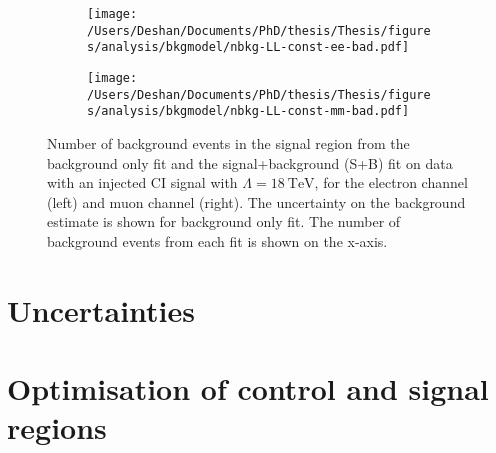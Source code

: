 \begin{figure}[h!]
    \centering
    \begin{subfigure}[b]{0.49\textwidth}
        \centering
        \texttt{[image: /Users/Deshan/Documents/PhD/thesis/Thesis/figures/analysis/bkgmodel/nbkg-LL-const-ee-bad.pdf]}
        \label{fig:bkgmodel:fitsbplusb1bad}
    \end{subfigure}
    \begin{subfigure}[b]{0.49\textwidth}
        \centering
        \texttt{[image: /Users/Deshan/Documents/PhD/thesis/Thesis/figures/analysis/bkgmodel/nbkg-LL-const-mm-bad.pdf]}
        \label{fig:bkgmodel:fitsbplusb2bad}
    \end{subfigure}
    \caption[Background estimation comparisons of the signal+background fit and background only fit in an invalid CR choice.]{Number of background events in the signal region from the background only fit and the signal+background (S+B) fit on data with an injected CI signal with $\Lambda = \SI{18}{\tera\electronvolt}$, for the electron channel (left) and muon channel (right). The uncertainty on the background estimate is shown for background only fit. The number of background events from each fit is shown on the x-axis.}
    \label{fig:bkgmodel:fitsbplusbbad}
\end{figure}

\section{Uncertainties}\label{sec:extrap:uncertainties}

\section{Optimisation of control and signal regions}\label{sec:extrap:optimisation}


